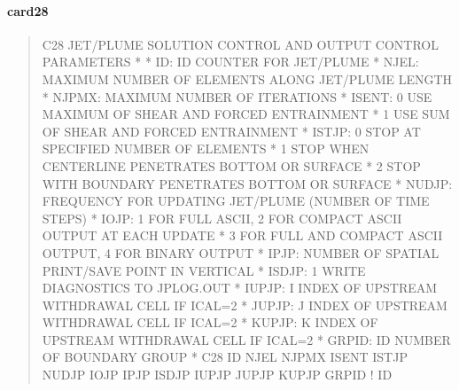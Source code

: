 \documentclass[letterpaper,10pt,english]{sphinxmanual}
\begin{document}
\paragraph{card28}
\label{\detokenize{inputfiles/runcontrol/card28:card28}}\label{\detokenize{inputfiles/runcontrol/card28::doc}}\begin{quote}

\begin{sphinxVerbatim}[commandchars=\\\{\}]
\PYGZhy{}\PYGZhy{}\PYGZhy{}\PYGZhy{}\PYGZhy{}\PYGZhy{}\PYGZhy{}\PYGZhy{}\PYGZhy{}\PYGZhy{}\PYGZhy{}\PYGZhy{}\PYGZhy{}\PYGZhy{}\PYGZhy{}\PYGZhy{}\PYGZhy{}\PYGZhy{}\PYGZhy{}\PYGZhy{}\PYGZhy{}\PYGZhy{}\PYGZhy{}\PYGZhy{}\PYGZhy{}\PYGZhy{}\PYGZhy{}\PYGZhy{}\PYGZhy{}\PYGZhy{}\PYGZhy{}\PYGZhy{}\PYGZhy{}\PYGZhy{}\PYGZhy{}\PYGZhy{}\PYGZhy{}\PYGZhy{}\PYGZhy{}\PYGZhy{}\PYGZhy{}\PYGZhy{}\PYGZhy{}\PYGZhy{}\PYGZhy{}\PYGZhy{}\PYGZhy{}\PYGZhy{}\PYGZhy{}\PYGZhy{}\PYGZhy{}\PYGZhy{}\PYGZhy{}\PYGZhy{}\PYGZhy{}\PYGZhy{}\PYGZhy{}\PYGZhy{}\PYGZhy{}\PYGZhy{}\PYGZhy{}\PYGZhy{}\PYGZhy{}\PYGZhy{}\PYGZhy{}\PYGZhy{}\PYGZhy{}\PYGZhy{}\PYGZhy{}\PYGZhy{}\PYGZhy{}\PYGZhy{}\PYGZhy{}\PYGZhy{}\PYGZhy{}\PYGZhy{}\PYGZhy{}\PYGZhy{}
C28 JET/PLUME SOLUTION CONTROL AND OUTPUT CONTROL PARAMETERS
*
*     ID:  ID COUNTER FOR JET/PLUME
*   NJEL:  MAXIMUM NUMBER OF ELEMENTS ALONG JET/PLUME LENGTH
*  NJPMX:  MAXIMUM NUMBER OF ITERATIONS
*  ISENT:  0 USE MAXIMUM OF SHEAR AND FORCED ENTRAINMENT
*          1 USE SUM OF SHEAR AND FORCED ENTRAINMENT
*  ISTJP:  0 STOP AT SPECIFIED NUMBER OF ELEMENTS
*          1 STOP WHEN CENTERLINE PENETRATES BOTTOM OR SURFACE
*          2 STOP WITH BOUNDARY PENETRATES BOTTOM OR SURFACE
*  NUDJP: FREQUENCY FOR UPDATING JET/PLUME (NUMBER OF TIME STEPS)
*   IOJP: 1 FOR FULL ASCII, 2 FOR COMPACT ASCII OUTPUT AT EACH UPDATE
*         3 FOR FULL AND COMPACT ASCII OUTPUT, 4 FOR BINARY OUTPUT
*   IPJP: NUMBER OF SPATIAL PRINT/SAVE POINT IN VERTICAL
*  ISDJP: 1 WRITE DIAGNOSTICS TO JPLOG\PYGZus{}\PYGZus{}.OUT
*  IUPJP:   I INDEX OF UPSTREAM WITHDRAWAL CELL IF ICAL=2 
*  JUPJP:   J INDEX OF UPSTREAM WITHDRAWAL CELL IF ICAL=2 
*  KUPJP:   K INDEX OF UPSTREAM WITHDRAWAL CELL IF ICAL=2 
*  GRPID:   ID NUMBER OF BOUNDARY GROUP
*
C28      ID    NJEL   NJPMX   ISENT   ISTJP   NUDJP    IOJP    IPJP   ISDJP   IUPJP   JUPJP   KUPJP     GRPID ! ID
\end{sphinxVerbatim}
\end{quote}
\end{document}
